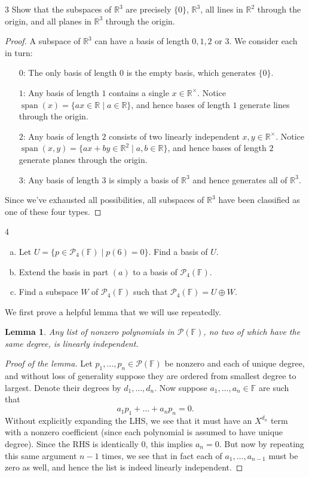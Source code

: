 \documentclass{extarticle}
\newenvironment{problem}[1]{\begin{prob*}{#1}{}}{\end{prob*}}
\newtheorem{lemma}[thm]{Lemma}
\newcommand{\R}{\mathbb{R}}
\newcommand{\F}{\mathbb{F}}
\DeclareMathOperator{\Span}{span}
\begin{document}
\begin{problem}{3}
Show that the subspaces of $\R^3$ are precisely $\{0\}$, $\R^3$, all lines in $\R^2$ through the origin, and all planes in $\R^3$ through the origin.
\end{problem}
\begin{proof}
A subspace of $\R^3$ can have a basis of length $0,1,2$ or $3$.  We consider each in turn:
\begin{itemize}
\item[$0$:] The only basis of length $0$ is the empty basis, which generates $\{0\}$.
\item[$1$:] Any basis of length $1$ contains a single $x\in\R^\times$.  Notice $\Span(x)=\{ax\in\R\mid a\in\R\}$, and hence bases of length $1$ generate lines through the origin.
\item[$2$:] Any basis of length $2$ consists of two linearly independent $x,y\in\R^\times$.  Notice $\Span(x,y)=\{ax + by\in\R^2\mid a,b\in\R\}$, and hence bases of length $2$ generate planes through the origin.
\item[$3$:] Any basis of length $3$ is simply a basis of $\R^3$ and hence generates all of $\R^3$.
\end{itemize}
Since we've exhausted all possibilities, all subspaces of $\R^3$ have been classified as one of these four types.
\end{proof}

\begin{problem}{4}
\begin{enumerate}[(a)]
\item Let $U=\{p\in\mathcal{P}_4(\F)\mid p(6) = 0\}$.  Find a basis of $U$.
\item Extend the basis in part $(a)$ to a basis of $\mathcal{P}_4(\F)$.
\item Find a subspace $W$ of $\mathcal{P}_4(\F)$ such that $\mathcal{P}_4(\F)=U\oplus W$.
\end{enumerate}
\end{problem}
\noindent We first prove a helpful lemma that we will use repeatedly.
\begin{lemma}
Any list of nonzero polynomials in $\mathcal{P}(\F)$, no two of which have the same degree, is linearly independent.
\end{lemma}
\begin{proof}[Proof of the lemma]
Let $p_1,\dots, p_n\in\mathcal{P}(\F)$ be nonzero and each of unique degree, and without loss of generality suppose they are ordered from smallest degree to largest.  Denote their degrees by $d_1,\dots,d_n$.  Now suppose $a_1,\dots, a_n\in\F$ are such that
\begin{equation*}
a_1p_1 + \dots + a_np_n = 0.
\end{equation*}
Without explicitly expanding the LHS, we see that it must have an $X^{d_n}$ term with a nonzero coefficient (since each polynomial is assumed to have unique degree).  Since the RHS is identically $0$, this implies $a_n=0$.  But now by repeating this same argument $n-1$ times, we see that in fact each of $a_1,\dots,a_{n-1}$ must be zero as well, and hence the list is indeed linearly independent.
\end{proof}
\end{document}
